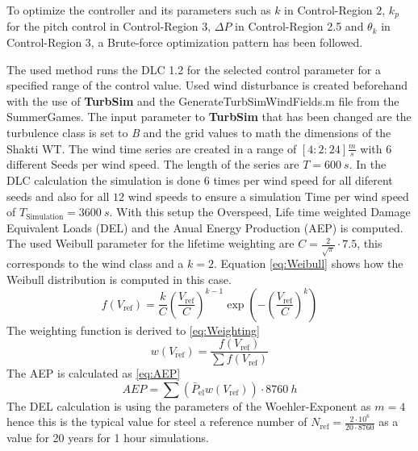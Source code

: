 To optimize the controller and its parameters such as $k$ in Control-Region 2, $k_p$ for the pitch control in Control-Region 3, $\Delta P$ in Control-Region 2.5 and $\theta_k$ in Control-Region 3, a Brute-force optimization pattern has been followed.

The used method runs the DLC 1.2 for the selected control parameter for a specified range of the control value. Used wind disturbance is created beforehand with the use of \textbf{TurbSim} and the GenerateTurbSimWindFields.m file from the SummerGames. The input parameter to \textbf{TurbSim} that has been changed are the turbulence class is set to \textit{B} and the grid values to math the dimensions of the Shakti WT. The wind time series are created in a range of $[4:2:24]\frac{m}{s}$ with $6$ different Seeds per wind speed. The length of the series are $T = \SI{600}{s}$. In the DLC calculation the simulation is done $6$ times per wind speed for all diferent seeds and also for all $12$ wind speeds to ensure a simulation Time per wind speed of $T_{\text{Simulation}} = \SI{3600}{s}$. With this setup the Overspeed, Life time weighted Damage Equivalent Loads (DEL) and the Anual Energy Production (AEP) is computed. The used Weibull parameter for the lifetime weighting are $C = \frac{2}{\sqrt{\pi}}\cdot7.5$, this corresponds to the wind class \MakeUppercase{} \cite{IEC61400-1} and a $k = 2$. Equation \ref{eq:Weibull} shows how the Weibull distribution is computed in this case.
\begin{equation}
	f(V_{\text{ref}}) = \frac{k}{C}\left(\frac{V_{\text{ref}}}{C}\right)^{k-1} \exp\left(-\left(\frac{V_{\text{ref}}}{C}\right)^k\right)
	\label{eq:Weibull}
\end{equation}
The weighting function is derived to \ref{eq:Weighting}
\begin{equation}
	w(V_{\text{ref}}) = \frac{f(V_{\text{ref}})}{\sum f(V_{\text{ref}})}
	\label{eq:Weighting}
\end{equation}
The AEP is calculated as \ref{eq:AEP}
\begin{equation}
	AEP = \sum \left(\bar{P}_{\text{el}}w(V_{\text{ref}})\right)\cdot \SI{8760}{h}
	\label{eq:AEP}
\end{equation}
The DEL calculation is using the parameters of the Woehler-Exponent as $m = 4$ hence this is the typical value for steel a reference number of $N_{\text{ref}} = \frac{2\cdot10^6}{20\cdot8760}$ as a value for 20 years for 1 hour simulations.
